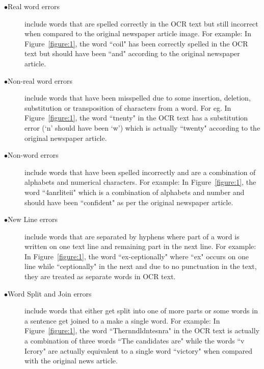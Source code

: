\documentclass[12pt]{article}
\makeatletter
\renewcommand\section{\@startsection{section}{1}{\z@}%
                                  {-3.5ex \@plus -1ex \@minus -.2ex}%
                                  {2.3ex \@plus.2ex}%
                                  {\normalfont\bfseries}}
\makeatother
\begin{document}
\begin{description}
 \item[$\bullet$Real word errors] include words that are spelled correctly in the OCR text but still incorrect when compared to the original newspaper article image. For example: In Figure~\ref{figure:1}, the word ``coil"  has been correctly spelled in the OCR text  but should have been ``and" according to the original newspaper article. 
 \item[$\bullet$Non-real word errors] include words that have been misspelled due to some insertion, deletion, substitution or transposition of characters from a word. For eg. In Figure~\ref{figure:1}, the word ``tnenty" in the OCR text has a substitution error (`n' should have been `w') which is actually ``twenty" according to the original newspaper article.
 \item[$\bullet$Non-word errors] include words that have been spelled incorrectly and are a combination of alphabets and numerical characters. For example: In Figure~\ref{figure:1}, the word ``4anrliteii" which is a combination of alphabets and number and should have been ``confident" as per the original newspaper article.
\item[$\bullet$New Line errors] include words that are separated by hyphens where part of a word is written on one text line and remaining part in the next line. For example: In Figure~\ref{figure:1}, the word ``ex-ceptionally" where ``ex" occurs on one line while ``ceptionally" in the next and due to no punctuation in the text, they are treated as separate words in OCR text.
\item[$\bullet$Word Split and Join errors] include words that either get split into one of more parts or some words in a sentence get joined to a make a single word. For example: In Figure~\ref{figure:1}, the word ``Thernndldntesnra" in the OCR text is actually a combination of three words ``The candidates are" while the words ``v Icrory" are actually equivalent to a single word ``victory" when compared with the original news article.
\end{description} 






 
\end{document}
